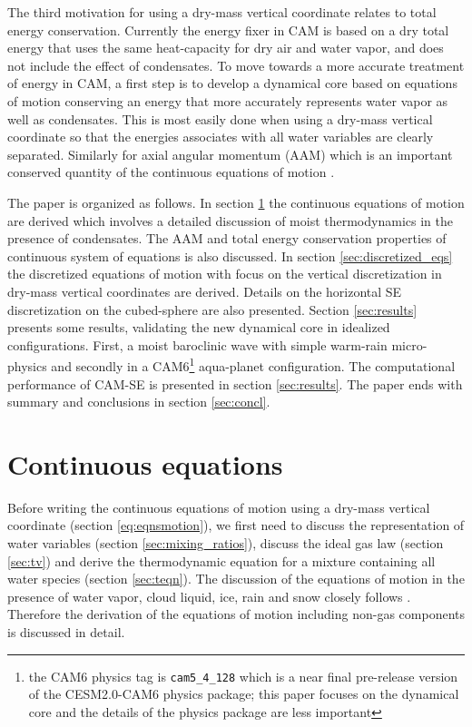 \documentclass{agujournal}
\begin{document}
{The third motivation for using a dry-mass vertical coordinate relates to total energy conservation. Currently the energy fixer in CAM is based on a dry total energy \citep{WOHTTV2015JAMES} that uses the same heat-capacity for dry air and water vapor, and does not include the effect of condensates. To move towards a more accurate treatment of energy in CAM, a first step is to develop a dynamical core based on equations of motion conserving an energy that more accurately represents water vapor as well as condensates. This is most easily done when using a dry-mass vertical coordinate so that the energies associates with all water variables are clearly separated. Similarly for axial angular momentum (AAM) which is an important conserved quantity of the continuous equations of motion \citep[e.g., ][]{LHECFF2010JGR}.

The paper is organized as follows. In section \ref{sec:cont-eq} the continuous equations of motion are derived which involves a detailed discussion of moist thermodynamics in the presence of condensates. The AAM and total energy conservation properties of continuous system of equations is also discussed. In section \ref{sec:discretized_eqs} the discretized equations of motion with focus on the vertical discretization in dry-mass vertical coordinates are derived. Details on the horizontal SE discretization on the cubed-sphere are also presented. Section \ref{sec:results} presents some results, validating the new dynamical core in idealized configurations. First, a moist baroclinic wave with simple warm-rain micro-physics and secondly in a CAM6{\footnote{the CAM6 physics tag is {\tt{cam5\_4\_128}} which is a near final pre-release version of the CESM2.0-CAM6 physics package; this paper focuses on the dynamical core and the details of the physics package are less important}} aqua-planet configuration. The computational performance of CAM-SE is presented in section \ref{sec:results}. The paper ends with summary and conclusions in section \ref{sec:concl}.
%
\section{Continuous equations}\label{sec:cont-eq}
Before writing the continuous equations of motion using a dry-mass vertical coordinate (section \ref{eq:eqnsmotion}), we first need to discuss the representation of water variables (section \ref{sec:mixing_ratios}), discuss the ideal gas law (section \ref{sec:tv}) and derive the thermodynamic equation for a mixture containing all water species (section \ref{sec:teqn}). The discussion of the equations of motion in the presence of water vapor, cloud liquid, ice, rain and snow closely follows \citet{joyOfUM}. {}  Therefore the derivation of the equations of motion including non-gas components is discussed in detail.

}
\end{document}
